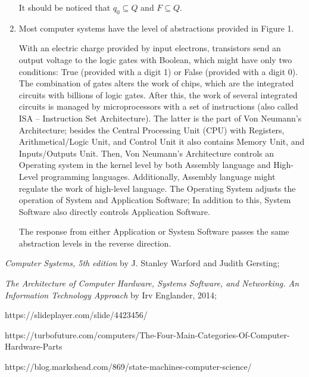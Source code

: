 \documentclass{scrartcl}
\begin{document}
\begin{Large}
\begin{enumerate}
\begin{enumerate}
\end{enumerate}

It should be noticed that $ q_{0} \subseteq Q $ and $ F \subseteq Q $.

\item Most computer systems have the level of abstractions provided in Figure 1.\newline

With an electric charge provided by input electrons, transistors send an output voltage to the logic gates with Boolean, which might have only two conditions: True (provided with a digit 1) or False (provided with a digit 0). The combination of gates alters the work of chips, which are the integrated circuits with billions of logic gates. After this, the work of several integrated circuits is managed by microprocessors with a set of instructions (also called ISA – Instruction Set Architecture). The latter is the part of Von Neumann’s Architecture; besides the Central Processing Unit (CPU) with Registers, Arithmetical/Logic Unit, and Control Unit it also contains Memory Unit, and Inputs/Outputs Unit. Then, Von Neumann’s Architecture controls an Operating system in the kernel level by both Assembly language and High-Level programming languages. Additionally, Assembly language might regulate the work of high-level language. The Operating System adjusts the operation of System and Application Software; In addition to this, System Software also directly controls Application Software.\newline

The response from either Application or System Software passes the same abstraction levels in the reverse direction.

\end{enumerate}



\begin{thebibliography}{9}
\textit{Computer Systems, 5th edition} by J. Stanley Warford and Judith Gersting;
 
\textit{The Architecture of Computer Hardware, Systems Software, and Networking. An Information Technology Approach} by Irv Englander, 2014;
 
https://slideplayer.com/slide/4423456/

https://turbofuture.com/computers/The-Four-Main-Categories-Of-Computer-Hardware-Parts

https://blog.markshead.com/869/state-machines-computer-science/

\end{thebibliography}
\end{Large}
\end{document}
